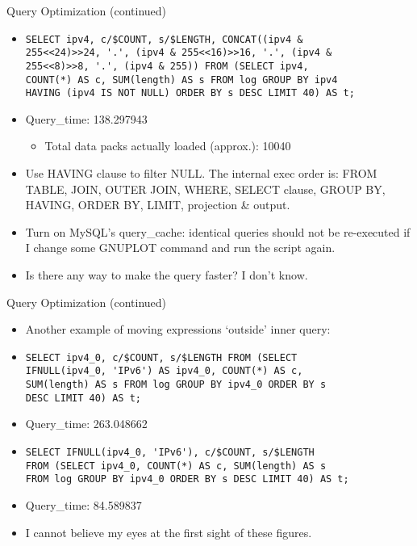 \documentclass{beamer}
\begin{document}
\begin{frame}[fragile]{Query Optimization (continued)}
\begin{itemize}
  \item {\small
\begin{verbatim}
SELECT ipv4, c/$COUNT, s/$LENGTH, CONCAT((ipv4 &
255<<24)>>24, '.', (ipv4 & 255<<16)>>16, '.', (ipv4 &
255<<8)>>8, '.', (ipv4 & 255)) FROM (SELECT ipv4,
COUNT(*) AS c, SUM(length) AS s FROM log GROUP BY ipv4
HAVING (ipv4 IS NOT NULL) ORDER BY s DESC LIMIT 40) AS t;
\end{verbatim}
}
  \item Query\_time: 138.297943
  \begin{itemize}
    \item Total data packs actually loaded (approx.): 10040
  \end{itemize}
  \item Use HAVING clause to filter NULL. The internal exec order is: FROM TABLE, JOIN, OUTER JOIN, WHERE, SELECT clause, GROUP BY, HAVING, ORDER BY, LIMIT, projection \& output.
  \item Turn on MySQL's query\_cache: identical queries should not be re-executed if I change some GNUPLOT command and run the script again.
  \item Is there any way to make the query faster? I don't know.
\end{itemize}
\end{frame}

\begin{frame}[fragile]{Query Optimization (continued)}
\begin{itemize}
  \item Another example of moving expressions `outside' inner query:
  \item {\small
\begin{verbatim}
SELECT ipv4_0, c/$COUNT, s/$LENGTH FROM (SELECT
IFNULL(ipv4_0, 'IPv6') AS ipv4_0, COUNT(*) AS c,
SUM(length) AS s FROM log GROUP BY ipv4_0 ORDER BY s
DESC LIMIT 40) AS t;
\end{verbatim}
}
  \item Query\_time: 263.048662
  \item {\small
\begin{verbatim}
SELECT IFNULL(ipv4_0, 'IPv6'), c/$COUNT, s/$LENGTH
FROM (SELECT ipv4_0, COUNT(*) AS c, SUM(length) AS s
FROM log GROUP BY ipv4_0 ORDER BY s DESC LIMIT 40) AS t;
\end{verbatim}
}
  \item Query\_time: 84.589837
  \item I cannot believe my eyes at the first sight of these figures.
\end{itemize}
\end{frame}
\end{document}
